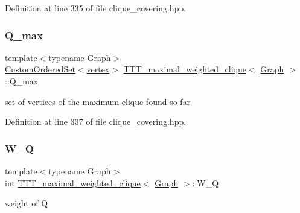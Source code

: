 Definition at line 335 of file clique\+\_\+covering.\+hpp.

\mbox{\label{classTTT__maximal__weighted__clique_a0c6de9332be4c12cd4c669dbfe3e2011}} 
\subsubsection{\texorpdfstring{Q\+\_\+max}{Q\_max}}
{\footnotesize\ttfamily template$<$typename Graph$>$ \\
\hyperlink{classCustomOrderedSet}{Custom\+Ordered\+Set}$<$\hyperlink{classTTT__maximal__weighted__clique_ac6a30ba8fb726c9c83eafe9dc451a799}{vertex}$>$ \hyperlink{classTTT__maximal__weighted__clique}{T\+T\+T\+\_\+maximal\+\_\+weighted\+\_\+clique}$<$ \hyperlink{structGraph}{Graph} $>$\+::Q\+\_\+max\hspace{0.3cm}{\ttfamily [private]}}



set of vertices of the maximum clique found so far 



Definition at line 337 of file clique\+\_\+covering.\+hpp.

\mbox{\label{classTTT__maximal__weighted__clique_aff8ee11dcab917ea5c3b219f1fd4bc03}} 
\subsubsection{\texorpdfstring{W\+\_\+Q}{W\_Q}}
{\footnotesize\ttfamily template$<$typename Graph$>$ \\
int \hyperlink{classTTT__maximal__weighted__clique}{T\+T\+T\+\_\+maximal\+\_\+weighted\+\_\+clique}$<$ \hyperlink{structGraph}{Graph} $>$\+::W\+\_\+Q\hspace{0.3cm}{\ttfamily [private]}}



weight of Q 



